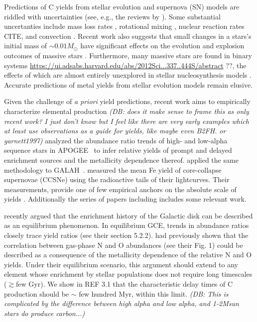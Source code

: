 \documentclass[fleqn,
usenatbib]{mnras}
\newcommand{\add}[1]{{\color{ForestGreen} #1}}
\newcommand{\dbadd}[1]{{\color{Thistle} #1}}
\newcommand{\dbnote}[1]{ {\color{Thistle} \textit{\small (DB: #1)}} }
\begin{document}
Predictions of C yields from stellar evolution and supernova (SN) models are riddled with uncertainties (see, e.g., the reviews by \citealt{romano+10, KL14}).
Some \dbadd{substantial uncertanties} include mass loss rates \citep{sukhbold+16, beasor+2020}, rotational mixing \citep{frischknecht+16, LC18}, nuclear reaction rates \dbadd{CITE}, and convection \citep{chieffi2001, ventura+13}.
Recent work also suggests that small changes in a stars's initial mass of 
 $\sim$$0.01 M_\odot$  have significant effects on the evolution and explosion outcomes of massive stars \citep{bruenn+2023, vartanyan_burrows2023}.
Furthermore, many \add{massive} stars are found in binary systems \dbadd{\url{https://ui.adsabs.harvard.edu/abs/2012Sci...337..444S/abstract} ??}, the effects of which are almost entirely
unexplored in stellar nucleosynthesis models \citet{farmer+21}.
Accurate predictions of metal yields from stellar evolution models remain elusive.

Given the challenge of {\it a priori} yield predictions, recent work aims to empirically characterize elemental production \dbnote{does it make sense to frame this as only recent work? I just don't know but I feel like there are very early examples which at least use observations as a guide for yields, like maybe even B2FH. or garnett1997}
\citet{weinberg+19, weinberg+22} analyzed the abundance ratio trends of high- and low-alpha sequence stars in APOGEE~\citep{apogee17} to infer relative yields of prompt and delayed enrichment sources and the metallicity dependence thereof.
\citet{emily+19, emily+22, emily+24} applied the same methodology to GALAH~\citep{DeSilva2015, Martell2017}.
\citet{rodriguez+21, rodriguez+23} measured the mean Fe yield of core-collapse supernovae (CCSNe) using the radioactive tails of their lightcurves.
Their measurements, provide one of few empirical anchors on the absolute scale of yields \citep{david_fe}.
\dbadd{Additionally the series of papers including \citet{eitner+2020} includes some relevant work.}


\citet{james+24} recently argued that the enrichment history of the Galactic disk can be described as an equilibrium phenomenon.
In equilibrium GCE, trends in abundance ratios closely trace yield ratios (see their section 5.2.2).
\citet{james+23} had previously shown that the correlation between gas-phase N and O abundances (see their Fig. 1) could be described as a consequence of the metallicity dependence of the relative N and O yields.
Under their equilibrium scenario, this argument should extend to any element whose enrichment by stellar populations does not require long timescales ($\gtrsim$few Gyr).
We show in \add{REF 3.1} that the characteristic delay times of C production should be $\sim$ few hundred Myr, within this limit. 
\dbnote{This is complicated by the difference between high alpha and low alpha, and 1-2Msun stars do produce carbon...}
\end{document}
